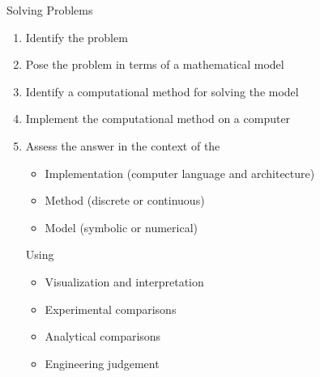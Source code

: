 \documentclass[xcolor=x11names,compress]{beamer}
\renewcommand{\(}{\begin{columns}}
\renewcommand{\)}{\end{columns}}
\newcommand{\<}[1]{\begin{column}{#1}}
\renewcommand{\>}{\end{column}}
\begin{document}
\begin{frame}{Solving Problems}
\begin{enumerate}
\item Identify the problem
\item Pose the problem in terms of a mathematical model
\item Identify a computational method for solving the model
\item Implement the computational method on a computer
\item Assess the answer in the context of the
\begin{itemize}
\item Implementation (computer language and architecture)
\item Method (discrete or continuous)
\item Model (symbolic or numerical)
\end{itemize}
Using
\begin{itemize}
\item Visualization and interpretation
\item Experimental comparisons
\item Analytical comparisons
\item Engineering judgement
\end{itemize}
\end{enumerate}
\end{frame}
\end{document}
